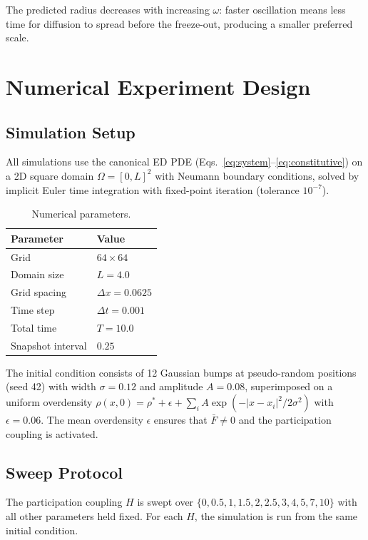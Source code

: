 \documentclass[11pt]{article}
\begin{document}
The predicted radius decreases with increasing \(\omega\): faster oscillation means less time for diffusion to spread before the freeze-out, producing a smaller preferred scale.

\section{Numerical Experiment Design}

\subsection{Simulation Setup}

All simulations use the canonical ED PDE (Eqs.~\ref{eq:system}--\ref{eq:constitutive}) on a 2D square domain \(\Omega = [0, L]^2\) with Neumann boundary conditions, solved by implicit Euler time integration with fixed-point iteration (tolerance \(10^{-7}\)).

\begin{table}[h]
\centering
\begin{tabular}{@{}ll@{}}
\toprule
Parameter & Value \\
\midrule
Grid & \(64 \times 64\) \\
Domain size & \(L = 4.0\) \\
Grid spacing & \(\Delta x = 0.0625\) \\
Time step & \(\Delta t = 0.001\) \\
Total time & \(T = 10.0\) \\
Snapshot interval & \(0.25\) \\
\bottomrule
\end{tabular}
\caption{Numerical parameters.}
\label{tab:numerics}
\end{table}

The initial condition consists of 12 Gaussian bumps at pseudo-random positions (seed 42) with width \(\sigma = 0.12\) and amplitude \(A = 0.08\), superimposed on a uniform overdensity \(\rho(x, 0) = \rho^* + \epsilon + \sum_i A\exp(-|x - x_i|^2 / 2\sigma^2)\) with \(\epsilon = 0.06\). The mean overdensity \(\epsilon\) ensures that \(\bar{F} \neq 0\) and the participation coupling is activated.

\subsection{Sweep Protocol}

The participation coupling \(H\) is swept over \(\{0, 0.5, 1, 1.5, 2, 2.5, 3, 4, 5, 7, 10\}\) with all other parameters held fixed. For each \(H\), the simulation is run from the same initial condition.
\end{document}
